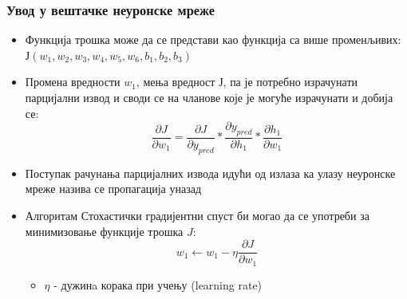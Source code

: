 \begin{frame}
\frametitle{Увод у вештачке неуронске мреже}
\begin{itemize}
 \item Функција трошка може да се представи као функција 
 са више променљивих:
 $Ј(w_1,w_2,w_3,w_4,w_5,w_6,b_1,b_2,b_3)$
 \item Промена вредности $w_1$, мења вредност $Ј$, па је потребно израчунати
 парцијални извод и своди се на чланове које је могуће израчунати и
 добија се:
 \begin{equation}
 \frac{\partial J}{\partial w_1} = \frac{\partial J}{\partial y_{pred}} * \frac{\partial y_{pred}}{\partial h_1} * \frac{\partial h_1}{\partial w_1}
 \end{equation}
 \item Поступак рачунања парцијалних извода идући од излаза ка улазу
  неуронске мреже
  назива се \alert{пропагација уназад}
 \item Алгоритам \alert{Стохастички градијентни спуст} би могао да се
 употреби за минимизовање функције трошка $J$:
 \begin{equation}
  w_1 \leftarrow w_1 - \eta \frac{\partial J}{\partial w_1}
 \end{equation}
 \begin{itemize}
  \item $\eta$ - \alert{дужинa корака при учењу} (\alert{learning rate})
 \end{itemize}
\end{itemize}
\end{frame}
